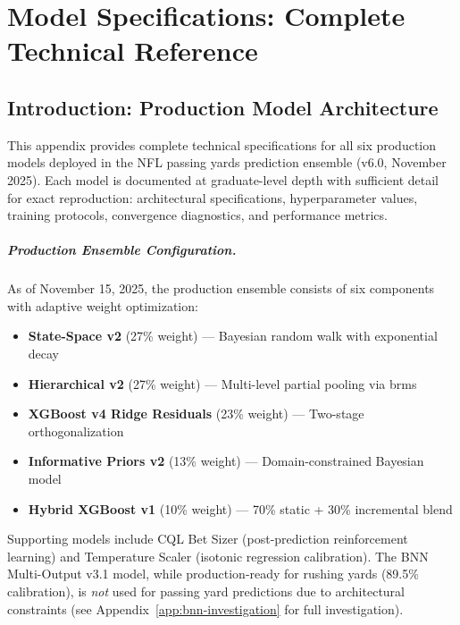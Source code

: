 
\chapter{Model Specifications: Complete Technical Reference}
\label{app:model-specifications}

\section{Introduction: Production Model Architecture}

This appendix provides complete technical specifications for all six production models deployed in the NFL passing yards prediction ensemble (v6.0, November 2025). Each model is documented at graduate-level depth with sufficient detail for exact reproduction: architectural specifications, hyperparameter values, training protocols, convergence diagnostics, and performance metrics.

\paragraph{Production Ensemble Configuration.}
As of November 15, 2025, the production ensemble consists of six components with adaptive weight optimization:
\begin{itemize}[itemsep=2pt,parsep=0pt]
    \item \textbf{State-Space v2} (27\% weight) --- Bayesian random walk with exponential decay
    \item \textbf{Hierarchical v2} (27\% weight) --- Multi-level partial pooling via brms
    \item \textbf{XGBoost v4 Ridge Residuals} (23\% weight) --- Two-stage orthogonalization
    \item \textbf{Informative Priors v2} (13\% weight) --- Domain-constrained Bayesian model
    \item \textbf{Hybrid XGBoost v1} (10\% weight) --- 70\% static + 30\% incremental blend
\end{itemize}

\noindent Supporting models include CQL Bet Sizer (post-prediction reinforcement learning) and Temperature Scaler (isotonic regression calibration). The BNN Multi-Output v3.1 model, while production-ready for rushing yards (89.5\% calibration), is \textit{not} used for passing yard predictions due to architectural constraints (see Appendix~\ref{app:bnn-investigation} for full investigation).

